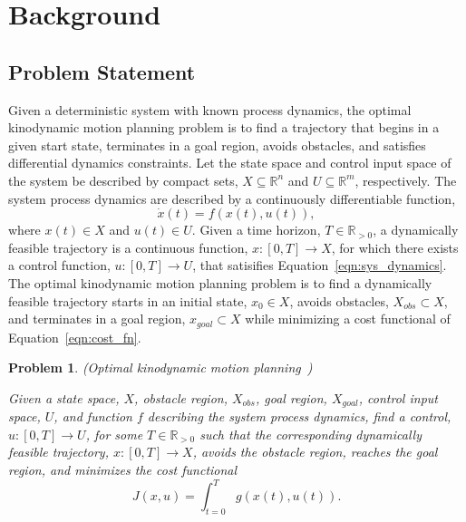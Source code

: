 \documentclass[letterpaper, 10pt, english, conference]{IEEEtran}
\newtheorem{problem}{Problem}
\begin{document}
\section{Background}

\subsection{Problem Statement}

Given a deterministic system with known process dynamics, the optimal
kinodynamic motion planning problem is to find a trajectory that
begins in a given start state, terminates in a goal region, avoids
obstacles, and satisfies differential dynamics constraints. Let the
state space and control input space of the system be described by
compact sets, $X \subseteq \mathbb{R}^n$ and $U \subseteq
\mathbb{R}^m$, respectively. The system process dynamics are described
by a continuously differentiable function,
\begin{equation}
\dot{x}(t) = f(x(t),u(t)),
\label{eqn:sys_dynamics}
\end{equation}
where $x(t) \in X$ and $u(t) \in U$. Given a time horizon, $T \in
\mathbb{R}_{>0}$, a dynamically feasible trajectory is a continuous
function, $x: [0,T] \to X$, for which there exists a control function,
$u:[0,T] \to U$, that satisifies Equation~\ref{eqn:sys_dynamics}. The
optimal kinodynamic motion planning problem is to find a dynamically
feasible trajectory starts in an initial state, $x_0 \in X$, avoids
obstacles, $X_{obs} \subset X$, and terminates in a goal region,
$x_{goal} \subset X$ while minimizing a cost functional of
Equation~\ref{eqn:cost_fn}.

\begin{problem}
\label{prob:1}
(Optimal kinodynamic motion planning~\cite{sertac_cdc10})

Given a state space, $X$, obstacle region, $X_{obs}$, goal region,
$X_{goal}$, control input space, $U$, and function $f$ describing the
system process dynamics, find a control, $u : [0,T] \to U$, for some $T
\in \mathbb{R}_{>0}$ such that the corresponding dynamically feasible
trajectory, $x : [0,T] \to X$, avoids the obstacle region, reaches the
goal region, and minimizes the cost functional
\begin{equation}
J(x,u) = \int_{t=0}^T g(x(t),u(t)).
\label{eqn:cost_fn}
\end{equation}

\end{problem}
\end{document}
